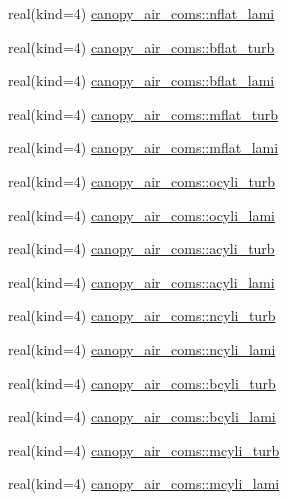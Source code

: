 \begin{DoxyCompactItemize}
\item 
real(kind=4) \hyperlink{namespacecanopy__air__coms_aebe2845272883354df889b85b1bad430}{canopy\+\_\+air\+\_\+coms\+::nflat\+\_\+lami}
\item 
real(kind=4) \hyperlink{namespacecanopy__air__coms_a7af62fb9a2088fae5b7f939ead3b0d0f}{canopy\+\_\+air\+\_\+coms\+::bflat\+\_\+turb}
\item 
real(kind=4) \hyperlink{namespacecanopy__air__coms_ac93abb13ce6ffe13f90e305450e3ae47}{canopy\+\_\+air\+\_\+coms\+::bflat\+\_\+lami}
\item 
real(kind=4) \hyperlink{namespacecanopy__air__coms_ac97963c22db07629cd6f65bce4201a0b}{canopy\+\_\+air\+\_\+coms\+::mflat\+\_\+turb}
\item 
real(kind=4) \hyperlink{namespacecanopy__air__coms_ae6457ac7f41cb8b0eead67da3f737a2e}{canopy\+\_\+air\+\_\+coms\+::mflat\+\_\+lami}
\item 
real(kind=4) \hyperlink{namespacecanopy__air__coms_ad9c2e83605f784b3a5f68fc55b0d682d}{canopy\+\_\+air\+\_\+coms\+::ocyli\+\_\+turb}
\item 
real(kind=4) \hyperlink{namespacecanopy__air__coms_aefa9b43396983e571ef5c4d1235b3884}{canopy\+\_\+air\+\_\+coms\+::ocyli\+\_\+lami}
\item 
real(kind=4) \hyperlink{namespacecanopy__air__coms_a42c5385303996a52e2fce111d922eaf2}{canopy\+\_\+air\+\_\+coms\+::acyli\+\_\+turb}
\item 
real(kind=4) \hyperlink{namespacecanopy__air__coms_a910e0e75420e6cd46075062c7da2b565}{canopy\+\_\+air\+\_\+coms\+::acyli\+\_\+lami}
\item 
real(kind=4) \hyperlink{namespacecanopy__air__coms_a683ef393f66f3515c40cd7a3278eaff8}{canopy\+\_\+air\+\_\+coms\+::ncyli\+\_\+turb}
\item 
real(kind=4) \hyperlink{namespacecanopy__air__coms_a4e37d8368e61b099d262a431a74acd3e}{canopy\+\_\+air\+\_\+coms\+::ncyli\+\_\+lami}
\item 
real(kind=4) \hyperlink{namespacecanopy__air__coms_a3a47f10726cc2b08ff03868bcbbd4445}{canopy\+\_\+air\+\_\+coms\+::bcyli\+\_\+turb}
\item 
real(kind=4) \hyperlink{namespacecanopy__air__coms_a5569cc0028fc90fc9c90e5148b2b6af3}{canopy\+\_\+air\+\_\+coms\+::bcyli\+\_\+lami}
\item 
real(kind=4) \hyperlink{namespacecanopy__air__coms_acb919351d7e124fc10afbf6c0bd1e974}{canopy\+\_\+air\+\_\+coms\+::mcyli\+\_\+turb}
\item 
real(kind=4) \hyperlink{namespacecanopy__air__coms_a9cef6c431c5209b9adb077d5cf7f3184}{canopy\+\_\+air\+\_\+coms\+::mcyli\+\_\+lami}

\end{DoxyCompactItemize}
